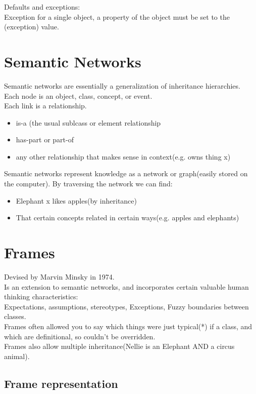 Defaults and exceptions:\\
Exception for a single object, a property of the object must be set to the (exception) value.\\

\section{Semantic Networks}
Semantic networks are essentially a generalization of inheritance hierarchies.\\
Each node is an object, class, concept, or event. \\

Each link is a relationship.
\begin{itemize}
\item is-a (the usual sublcass or element relationship
\item has-part or part-of
\item any other relationship that makes sense in context(e.g. owns thing x)
\end{itemize}

Semantic networks represent knowledge as a network or graph(easily stored on the computer). 
By traversing the network we can find:
\begin{itemize}
\item Elephant x likes apples(by inheritance)
\item That certain concepts related in certain ways(e.g. apples and elephants)
\end{itemize}

\section{Frames}
Devised by Marvin Minsky in 1974.\\
Is an extension to semantic networks, and incorporates certain valuable human thinking characteristics:\\
Expectations, assumptions, stereotypes, Exceptions, Fuzzy boundaries between classes.\\

Frames often allowed you to say which things were just typical(*) if a class, and which are definitional, so couldn't be overridden.\\
Frames also allow multiple inheritance(Nellie is an Elephant AND a circus animal).\\

\subsection{Frame representation}






